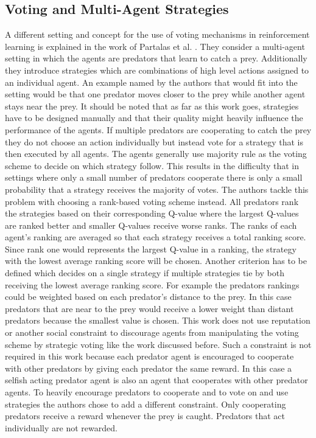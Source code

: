 \documentclass[conference]{IEEEtran}
\begin{document}
\subsection{Voting and Multi-Agent Strategies}
A different setting and concept for the use of voting mechanisms in reinforcement learning is explained in the work of Partalas et al. \cite{partalas2008hybrid}. They consider a multi-agent setting in which the agents are predators that learn to catch a prey.
\newline
Additionally they introduce strategies which are combinations of high level actions assigned to an individual agent. An example named by the authors that would fit into the setting would be that one predator moves closer to the prey while another agent stays near the prey. It should be noted that as far as this work goes, strategies have to be designed manually and that their quality might heavily influence the performance of the agents.
\newline
If multiple predators are cooperating to catch the prey they do not choose an action individually but instead vote for a strategy that is then executed by all agents. The agents generally use majority rule as the voting scheme to decide on which strategy follow. This results in the difficulty that in settings where only a small number of predators cooperate there is only a small probability that a strategy receives the majority of votes. The authors tackle this problem with choosing a rank-based voting scheme instead. All predators rank the strategies based on their corresponding Q-value where the largest Q-values are ranked better and smaller Q-values receive worse ranks. The ranks of each agent's ranking are averaged so that each strategy receives a total ranking score. Since rank one would represents the largest Q-value in a ranking, the strategy with the lowest average ranking score will be chosen. Another criterion has to be defined which decides on a single strategy if multiple strategies tie by both receiving the lowest average ranking score. For example the predators rankings could be weighted based on each predator's distance to the prey. In this case predators that are near to the prey would receive a lower weight than distant predators because the smallest value is chosen.
\newline
This work does not use reputation or another social constraint to discourage agents from manipulating the voting scheme by strategic voting like the work discussed before. Such a constraint is not required in this work because each predator agent is encouraged to cooperate with other predators by giving each predator the same reward. In this case a selfish acting predator agent is also an agent that cooperates with other predator agents. To heavily encourage predators to cooperate and to vote on and use strategies the authors chose to add a different constraint. Only cooperating predators receive a reward whenever the prey is caught. Predators that act individually are not rewarded.
\end{document}
